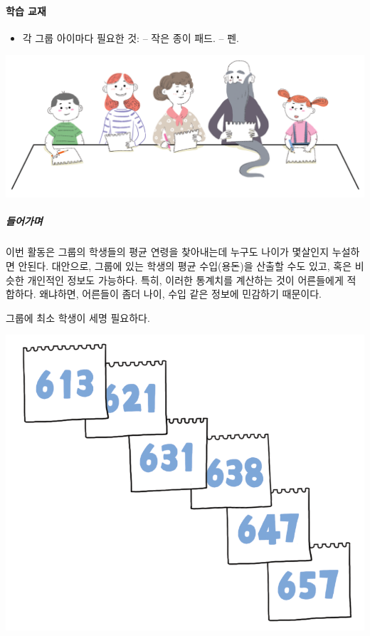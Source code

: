 \documentclass[]{article}
\begin{document}
\mbox{}\paragraph{학습 교재}\label{section-229}

\begin{itemize}
\itemsep1pt\parskip0pt
\item
  각 그룹 아이마다 필요한 것: -- 작은 종이 패드. -- 펜.
\end{itemize}


\includegraphics{csunplugged/05-part/img/ch17-info-hiding/16-info-hiding-01-sharing-secrets.png}

\subparagraph{들어가며}\label{section-230}

이번 활동은 그룹의 학생들의 평균 연령을 찾아내는데 누구도 나이가
몇살인지 누설하면 안된다. 대안으로, 그룹에 있는 학생의 평균 수입(용돈)을
산출할 수도 있고, 혹은 비슷한 개인적인 정보도 가능하다. 특히, 이러한
통계치를 계산하는 것이 어른들에게 적합하다. 왜냐하면, 어른들이 좀더
나이, 수입 같은 정보에 민감하기 때문이다.

그룹에 최소 학생이 세명 필요하다.

\includegraphics{csunplugged/05-part/img/ch17-info-hiding/16-info-hiding-02-three-digits-number.png}
\end{document}
